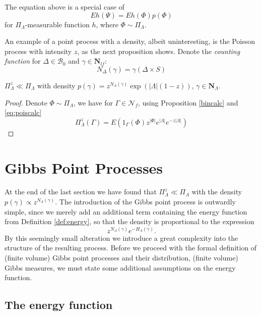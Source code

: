 	The equation above is a special case of 
$$Eh(\Psi)=Eh(\Phi)p(\Phi)$$
for $\Pi_\Lambda$-measurable function $h$, where $\Phi \sim \Pi_\Lambda$.

An example of a point process with a density, albeit uninteresting, is the Poisson process with intensity $z$, as the next proposition shows.\newline
Denote the \textit{counting function} for $\Delta \in \mathcal B_0$ and $\gamma \in \mathbf N_{lf}$:
$$N_\Delta(\gamma) = \gamma(\Delta \times S)$$ 

\begin{proposition}\label{prop:poisabscont} $\Pi_\Lambda^z \ll \Pi_\Lambda$ with density $p(\gamma)=z^{N_\Lambda(\gamma)} \exp(|\Lambda|(1-z))$, $\gamma \in \mathbf N_{\Lambda}$.
\end{proposition}
\begin{proof}
	Denote $\Phi \sim \Pi_\Lambda$, we have for $\Gamma\in \mathcal N_{f}$, using Proposition \ref{bincalc} and \eqref{eq:poiscalc}
	$$\Pi^z_\Lambda(\Gamma) = E(1_\Gamma(\Phi)  z^{|\Phi|} e^{|\Lambda|} e^{-z|\Lambda|}) $$
\end{proof}





\section{Gibbs Point Processes}\label{sec:GPP}
At the end of the last section we have found that $\Pi^z_\Lambda \ll \Pi_\Lambda$ with the density $p(\gamma) \propto z^{N_\Lambda(\gamma)}$. The introduction of the Gibbs point process is outwardly simple, since we merely add an additional term containing the energy function from Definition \ref{def:energy}, so that the density is proportional to the expression
\begin{equation}\label{eq:GPPdensity}z^{N_\Lambda(\gamma)} e^{-H_\Lambda (\gamma)}.\end{equation}
By this seemingly small alteration we introduce a great complexity into the structure of the resulting process. Before we proceed with the formal definition of (finite volume) Gibbs point processes and their distribution, (finite volume) Gibbs measures, we must state some additional assumptions on the energy function.


\subsection{The energy function}\label{sec:energyfunction}

